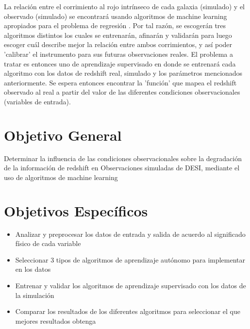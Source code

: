 \documentclass[12pt]{article}
\begin{document}
La relación entre el corrimiento al rojo intr\'inseco de cada galaxia
(simulado) y el observado (simulado) se encontrará usando algoritmos de machine
learning apropiados para el problema de regresión
\cite{bishop2006pattern}. Por tal razón, se escogerán tres algoritmos
distintos los cuales se entrenarán, afinarán y validarán para luego
escoger cuál describe mejor la relación entre ambos corrimientos, y
así poder 'calibrar' el instrumento para sus futuras observaciones
reales. El problema a tratar es entonces uno de aprendizaje
supervisado en donde se entrenará cada algoritmo con los datos de
redshift real, simulado y los parámetros mencionados anteriormente. Se
espera entonces encontrar la 'función' que mapea el redshift observado
al real a partir del valor de las diferentes condiciones
observacionales (variables de entrada).  







\section{Objetivo General}


Determinar la influencia de las condiciones observacionales sobre la
degradación de la información de redshift en Observaciones simuladas
de DESI, mediante el uso de algoritmos de machine learning 
 
\section{Objetivos Específicos}


\begin{itemize}
	\item Analizar y preprocesar los datos de entrada y salida de acuerdo al significado físico de cada variable
	\item Seleccionar 3 tipos de algoritmos de aprendizaje autónomo para implementar en los datos
	\item Entrenar y validar los algoritmos de aprendizaje
          supervisado con los datos de la simulación
	\item Comparar los resultados de los diferentes algoritmos
          para seleccionar el que mejores resultados obtenga 
\end{itemize}
\end{document}
